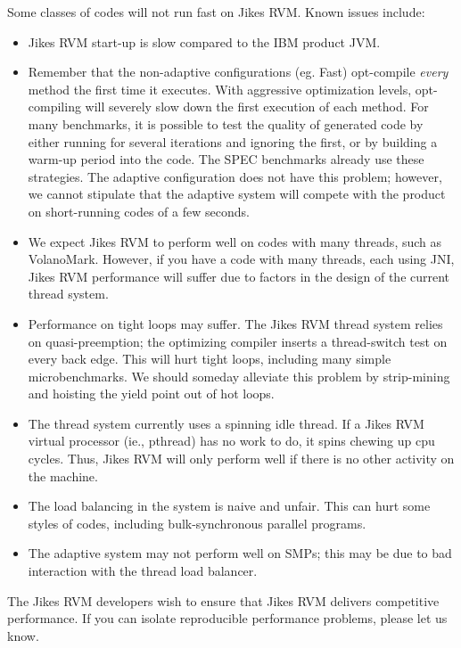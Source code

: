 Some classes of codes will not run fast on Jikes RVM.  Known issues include:
\begin{itemize}
\item Jikes RVM start-up is slow compared to the IBM product JVM.
\item Remember that the non-adaptive configurations (eg. Fast) opt-compile
{\em every} method the first time it executes.  With aggressive optimization
levels, opt-compiling will severely slow down the first execution of
each method.  For many benchmarks, it is possible to test the quality
of generated code by either running for several iterations and ignoring
the first, or by building a warm-up period into the code.  The SPEC benchmarks
already use these strategies.  The adaptive configuration does not
have this problem; however, we cannot stipulate that the adaptive
system will compete with the product on short-running codes of a few seconds.
\item We expect Jikes RVM to perform well on codes with many threads, such as
VolanoMark.  However, if you have a code with many threads, each using
JNI, Jikes RVM performance will suffer due to factors in the design of
the current thread system.
\item Performance on tight loops may suffer.  The Jikes RVM thread system
relies on quasi-preemption; the optimizing compiler inserts a thread-switch
test on every back edge.  This will hurt tight loops, including many
simple microbenchmarks.  We should someday alleviate this problem by
strip-mining and hoisting the yield point out of hot loops.
\item The thread system currently uses a spinning idle thread. If a
Jikes RVM
virtual processor (ie., pthread) has no work to do, it spins chewing up
cpu cycles.  Thus, Jikes RVM will only perform well if there is no other activity on the machine.
\item The load balancing in the system is naive and unfair.  This can hurt some styles of codes, including bulk-synchronous parallel programs.
\item The adaptive system may not perform well on SMPs; this may be due to bad
interaction with the thread load balancer.
\end{itemize}

The Jikes RVM developers wish to ensure that Jikes RVM delivers
competitive performance. 
If you can isolate reproducible performance problems, please let us
know. 

\AIXTMFooter
